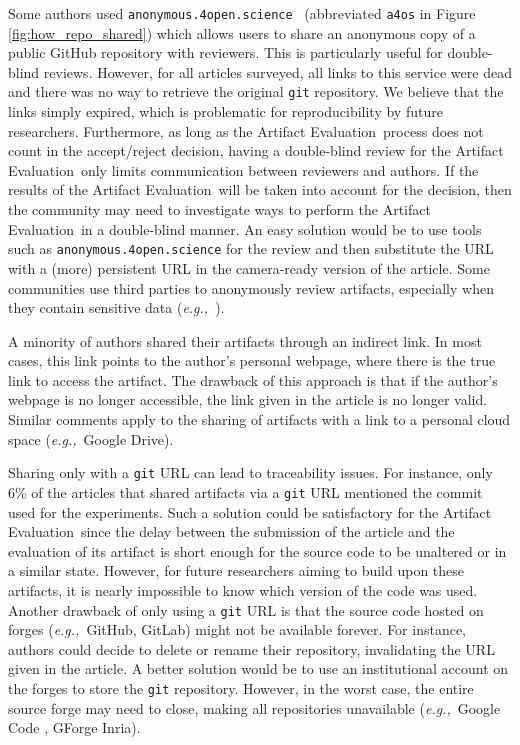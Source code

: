 \documentclass[sigconf,natbib=false]{acmart}
\newcommand{\eg}{\emph{e.g.,}}
\newcommand{\aeval}{Artifact Evaluation}
\begin{document}
Some authors used \texttt{anonymous.4open.science}\ \cite{anonymous_github} (abbreviated \texttt{a4os} in Figure \ref{fig:how_repo_shared}) which allows users to share an anonymous copy of a public GitHub repository with reviewers.
This is particularly useful for double-blind reviews.
However, for all articles surveyed, all links to this service were dead and there was no way to retrieve the original \texttt{git} repository.
We believe that the links simply expired, which is problematic for reproducibility by future researchers.
Furthermore, as long as the \aeval\ process does not count in the accept/reject decision, having a double-blind review for the \aeval\ only limits communication between reviewers and authors.
If the results of the \aeval\ will be taken into account for the decision, then the community may need to investigate ways to perform the \aeval\ in a double-blind manner.
An easy solution would be to use tools such as \texttt{anonymous.4open.science} \cite{anonymous_github} for the review and then substitute the URL with a (more) persistent URL in the camera-ready version of the article.
Some communities use third parties to anonymously review artifacts, especially when they contain sensitive data (\eg\ \cite{perignon2019certify}).

A minority of authors shared their artifacts through an indirect link.
In most cases, this link points to the author's personal webpage, where there is the true link to access the artifact.
The drawback of this approach is that if the author's webpage is no longer accessible, the link given in the article is no longer valid.
Similar comments apply to the sharing of artifacts with a link to a personal cloud space (\eg\ Google Drive).

Sharing only with a \texttt{git} URL can lead to traceability issues.
For instance, only 6\% of the articles that shared artifacts via a \texttt{git} URL mentioned the commit used for the experiments.
Such a solution could be satisfactory for the \aeval\ since the delay between the submission of the article and the evaluation of its artifact is short enough for the source code to be unaltered or in a similar state.
However, for future researchers aiming to build upon these artifacts, it is nearly impossible to know which version of the code was used.
Another drawback of only using a \texttt{git} URL is that the source code hosted on forges (\eg\ GitHub, GitLab) might not be available forever.
For instance, authors could decide to delete or rename their repository, invalidating the URL given in the article.
A better solution would be to use an institutional account on the forges to store the \texttt{git} repository.
However, in the worst case, the entire source forge may need to close, making all repositories unavailable (\eg\ Google Code \cite{google_code}, GForge Inria).
\end{document}
